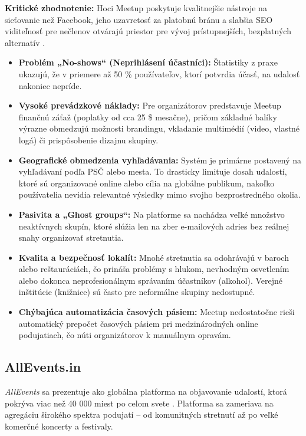 \noindent \textbf{Kritické zhodnotenie:} Hoci Meetup poskytuje kvalitnejšie nástroje na sieťovanie než Facebook, jeho uzavretosť za platobnú bránu a slabšia SEO viditeľnosť pre nečlenov otvárajú priestor pre vývoj prístupnejších, bezplatných alternatív \cite{somerfleck2021meetup, meetup_agile_bratislava}.
\begin{itemize}[noitemsep]
    \item \textbf{Problém „No-shows“ (Neprihlásení účastníci):} Štatistiky z praxe ukazujú, že v priemere až 50 \% 
    používateľov, ktorí potvrdia účasť, na udalosť nakoniec nepríde. 
    \item \textbf{Vysoké prevádzkové náklady:} Pre organizátorov predstavuje Meetup finančnú záťaž (poplatky od cca 25 \$ mesačne), 
    pričom základné balíky výrazne obmedzujú možnosti brandingu, vkladanie multimédií (video, vlastné logá) či prispôsobenie dizajnu skupiny.
    \item \textbf{Geografické obmedzenia vyhľadávania:} Systém je primárne postavený na vyhľadávaní podľa PSČ alebo mesta.
     To drasticky limituje dosah udalostí, ktoré sú organizované online alebo cília na globálne publikum, 
     nakoľko používatelia nevidia relevantné výsledky mimo svojho bezprostredného okolia.
    \item \textbf{Pasivita a „Ghost groups“:} Na platforme sa nachádza veľké množstvo neaktívnych skupín, ktoré slúžia len na 
    zber e-mailových adries bez reálnej snahy organizovať stretnutia.
    \item \textbf{Kvalita a bezpečnosť lokalít:} Mnohé stretnutia sa odohrávajú v baroch alebo reštauráciách, čo prináša problémy s hlukom, 
    nevhodným osvetlením alebo dokonca neprofesionálnym správaním účastníkov (alkohol). 
    Verejné inštitúcie (knižnice) sú často pre neformálne skupiny nedostupné.
    \item \textbf{Chýbajúca automatizácia časových pásiem:} Meetup nedostatočne rieši automatický prepočet časových pásiem pri medzinárodných online podujatiach, čo núti organizátorov k manuálnym opravám.
\end{itemize}


\subsection{AllEvents.in}
\textit{AllEvents} sa prezentuje ako globálna platforma na objavovanie udalostí, ktorá pokrýva viac než 40 000 miest po celom svete \cite{allevents_web}. Platforma sa zameriava na agregáciu širokého spektra podujatí – od komunitných stretnutí až po veľké komerčné koncerty a festivaly.

